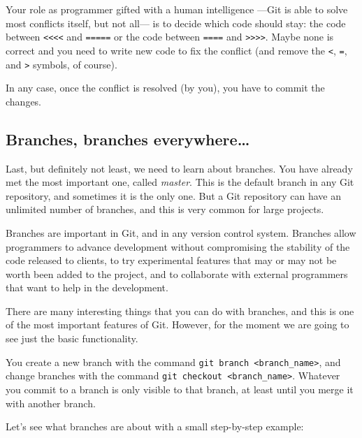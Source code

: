Your role as programmer gifted with a human intelligence ---Git is
able to solve most conflicts itself, but not all--- is to decide
which code should stay: the code between \verb+<<<<+ and \verb+=====+
or the code between \verb+====+ and \verb+>>>>+. Maybe none is
correct and you need to write new code to fix the conflict (and remove
the \verb+<+, \verb+=+, and \verb+>+ symbols, of course). 

In any case, once the conflict is resolved (by you), 
you have to commit the changes. 


\subsection{Branches, branches everywhere\ldots}
\label{sec:branch-branch-everyw}

Last, but definitely not least, we need to learn about branches. You
have already met the most important one, called \emph{master}. This is
the default branch in any Git repository, and sometimes it is the only
one. But a Git repository can have an unlimited number of branches,
and this is very common for large projects. 

Branches are important in Git, and in any version control
system. Branches allow programmers to advance development without
compromising the stability of the code released to clients, to try
experimental features that may or may not be worth been added to the
project, and to collaborate with external programmers that want to
help in the development. 

There are many interesting things that you can do with branches, and
this is one of the most important features of Git. However, for the
moment we are going to see just the basic functionality. 

You create a new branch with the command 
\verb+git branch <branch_name>+, and change branches with the command
\verb+git checkout <branch_name>+. Whatever you commit to a branch is
only visible to that branch, at least until you merge it with another
branch. 

Let's see what branches are about with a small step-by-step example: 

